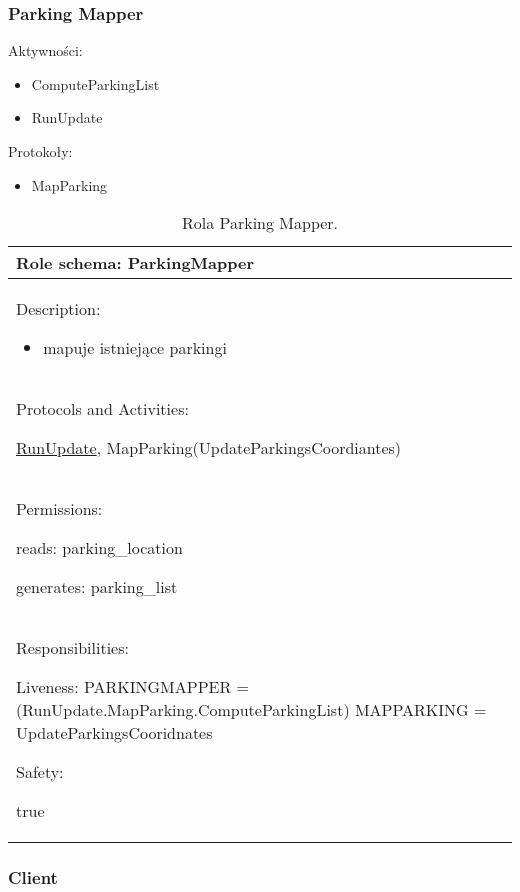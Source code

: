 \newpage
\subsubsection{Parking Mapper}

Aktywności:
\begin{itemize}
    \item ComputeParkingList
    \item RunUpdate

\end{itemize}

Protokoły:
\begin{itemize}
    \item MapParking
\end{itemize}


\begin{table}[!h] \label{tab:rola1} \centering
    \caption{Rola Parking Mapper.}
    \begin{tabular} {| p{14cm} |} \hline
        Role schema: ParkingMapper \\ \hline
        Description:

        \begin{itemize}
            \item mapuje istniejące parkingi
        \end{itemize} \\ \hline
        Protocols and Activities: 
        
        \ul{RunUpdate}, MapParking(UpdateParkingsCoordiantes) \\ \hline
        Permissions:

        reads: parking\_location

        generates:  parking\_list                                                                                 \\ \hline
        Responsibilities:

        Liveness: PARKINGMAPPER = (RunUpdate.MapParking.ComputeParkingList)
        MAPPARKING = UpdateParkingsCooridnates 
        

        Safety:

        \hspace{5mm} true                                                                                                                \\ \hline
    \end{tabular}
\end{table}

\newpage
\subsubsection{Client}

